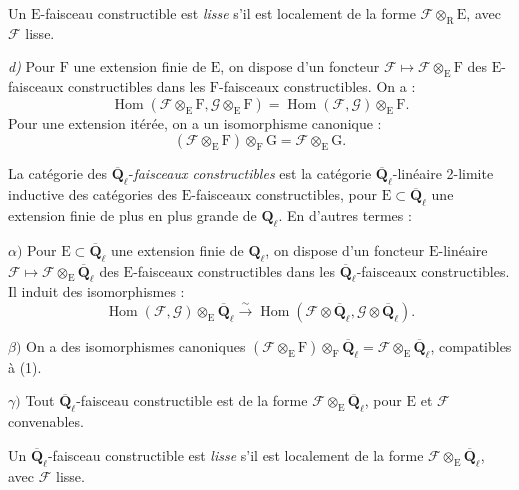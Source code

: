 \documentclass[11pt,leqno]{article}
\begin{document}
Un \(\mathrm{E}\)-faisceau constructible est \textit{lisse} s’il est localement de la forme \(\mathscr{F}\otimes_{\mathrm{R}}\mathrm{E}\), avec \(\mathscr{F}\) lisse.

\textit{d)} Pour \(\mathrm{F}\) une extension finie de \(\mathrm{E}\), on dispose d’un foncteur \(\mathscr{F}\mapsto\mathscr{F}\otimes_{\mathrm{E}}\mathrm{F}\) des \(\mathrm{E}\)-faisceaux constructibles dans les \(\mathrm{F}\)-faisceaux constructibles. On a :
\[
\operatorname{Hom}(\mathscr{F}\otimes_{\mathrm{E}}\mathrm{F},\mathscr{G}\otimes_{\mathrm{E}}\mathrm{F})
=\operatorname{Hom}(\mathscr{F},\mathscr{G})\otimes_{\mathrm{E}}\mathrm{F}.
\]
Pour une extension itérée, on a un isomorphisme canonique :
\[
(\mathscr{F}\otimes_{\mathrm{E}}\mathrm{F})\otimes_{\mathrm{F}}\mathrm{G}
=\mathscr{F}\otimes_{\mathrm{E}}\mathrm{G}.
\tag*{(1)}
\]

La catégorie des \(\overline{\mathbf{Q}}_\ell\)-\textit{faisceaux constructibles} est la catégorie \(\overline{\mathbf{Q}}_\ell\)-linéaire 2-limite inductive des catégories des \(\mathrm{E}\)-faisceaux constructibles, pour \(\mathrm{E}\subset\overline{\mathbf{Q}}_\ell\) une extension finie de plus en plus grande de \(\mathbf{Q}_\ell\). En d’autres termes :

\noindent \(\alpha)\) Pour \(\mathrm{E}\subset\overline{\mathbf{Q}}_\ell\) une extension finie de \(\mathbf{Q}_\ell\), on dispose d’un foncteur \(\mathrm{E}\)-linéaire \(\mathscr{F}\mapsto\mathscr{F}\otimes_{\mathrm{E}}\overline{\mathbf{Q}}_\ell\) des \(\mathrm{E}\)-faisceaux constructibles dans les \(\overline{\mathbf{Q}}_\ell\)-faisceaux constructibles. Il induit des isomorphismes :
\[
\operatorname{Hom}(\mathscr{F},\mathscr{G})\otimes_{\mathrm{E}}\overline{\mathbf{Q}}_\ell
\overset{\sim}{\to}
\operatorname{Hom}(\mathscr{F}\otimes\overline{\mathbf{Q}}_\ell,\mathscr{G}\otimes\overline{\mathbf{Q}}_\ell).
\]

\noindent \(\beta)\) On a des isomorphismes canoniques \((\mathscr{F}\otimes_{\mathrm{E}}\mathrm{F})\otimes_{\mathrm{F}}\overline{\mathbf{Q}}_\ell=\mathscr{F}\otimes_{\mathrm{E}}\overline{\mathbf{Q}}_\ell\), compatibles à (1).

\noindent \(\gamma)\) Tout \(\overline{\mathbf{Q}}_\ell\)-faisceau constructible est de la forme \(\mathscr{F}\otimes_{\mathrm{E}}\overline{\mathbf{Q}}_\ell\), pour \(\mathrm{E}\) et \(\mathscr{F}\) convenables.

Un \(\overline{\mathbf{Q}}_\ell\)-faisceau constructible est \textit{lisse} s’il est localement de la forme \(\mathscr{F}\otimes_{\mathrm{E}}\overline{\mathbf{Q}}_\ell\), avec \(\mathscr{F}\) lisse.
\end{document}
